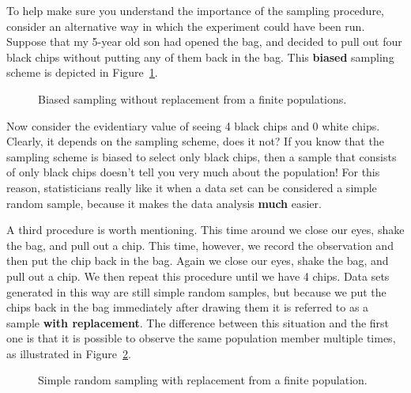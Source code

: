 \documentclass[
  letterpaper,
  DIV=11,
  numbers=noendperiod]{scrreprt}
\begin{document}
To help make sure you understand the importance of the sampling
procedure, consider an alternative way in which the experiment could
have been run. Suppose that my 5-year old son had opened the bag, and
decided to pull out four black chips without putting any of them back in
the bag. This \textbf{biased} sampling scheme is depicted in
Figure~\ref{fig-brs}.

\begin{figure}


\caption{\label{fig-brs}Biased sampling without replacement from a
finite populations.}

\end{figure}%

Now consider the evidentiary value of seeing 4 black chips and 0 white
chips. Clearly, it depends on the sampling scheme, does it not? If you
know that the sampling scheme is biased to select only black chips, then
a sample that consists of only black chips doesn't tell you very much
about the population! For this reason, statisticians really like it when
a data set can be considered a simple random sample, because it makes
the data analysis \textbf{much} easier.

A third procedure is worth mentioning. This time around we close our
eyes, shake the bag, and pull out a chip. This time, however, we record
the observation and then put the chip back in the bag. Again we close
our eyes, shake the bag, and pull out a chip. We then repeat this
procedure until we have 4 chips. Data sets generated in this way are
still simple random samples, but because we put the chips back in the
bag immediately after drawing them it is referred to as a sample
\textbf{with replacement}. The difference between this situation and the
first one is that it is possible to observe the same population member
multiple times, as illustrated in Figure~\ref{fig-srs2}.

\begin{figure}


\caption{\label{fig-srs2}Simple random sampling with replacement from a
finite population.}

\end{figure}%
\end{document}
